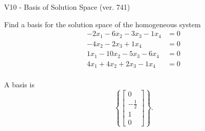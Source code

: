 \begin{exercise}
  \begin{exerciseTitle}V10 - Basis of Solution Space (ver. 741)\end{exerciseTitle}
  \begin{exerciseStatement}
    Find a basis for the solution space of the homogeneous system 
\begin{align*}
 -2 x_ 1 -6 x_ 2 -3 x_ 3 -1 x_ 4 &= 0  \\ 
  -4 x_ 2 -2 x_ 3 + 1 x_ 4 &= 0  \\ 
  1 x_ 1 -10 x_ 2 -5 x_ 3 -6 x_ 4 &= 0  \\ 
  4 x_ 1 + 4 x_ 2 + 2 x_ 3 -1 x_ 4 &= 0  \\ 
 \end{align*}


 
  \end{exerciseStatement}

  \begin{exerciseAnswer}
   A basis is   
\[\left\{\left[\begin{array}{c}
0 \\
-\frac{1}{2} \\
1 \\
0
\end{array}\right]\right\}.\]

  


  \end{exerciseAnswer}
\end{exercise}